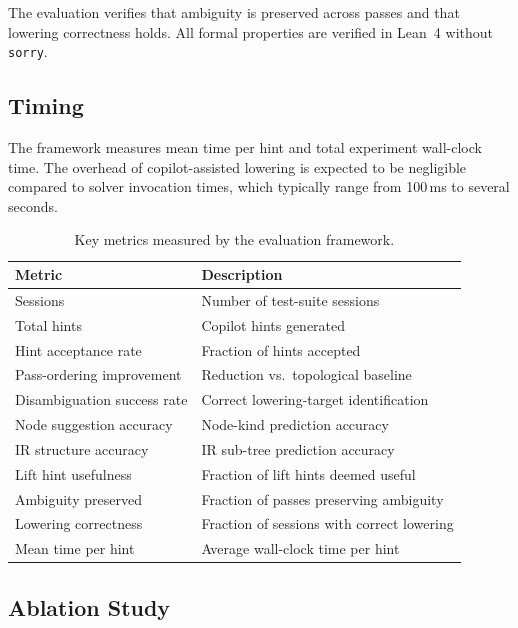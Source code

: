 \documentclass[11pt]{article}
\begin{document}
The evaluation verifies that ambiguity is preserved across passes and
that lowering correctness holds.  All formal
properties are verified in Lean~4 without \texttt{sorry}.

\subsection{Timing}\label{sec:exp-timing}

The framework measures mean time per hint and total
experiment wall-clock time.  The overhead of
copilot-assisted lowering is expected to be negligible compared to solver invocation
times, which typically range from 100\,ms to several seconds.

\begin{table}[t]
\centering
\caption{Key metrics measured by the evaluation framework.}
\label{tab:summary}
\begin{tabular}{l l}
\hline
\textbf{Metric} & \textbf{Description} \\
\hline
Sessions                        & Number of test-suite sessions \\
Total hints                     & Copilot hints generated \\
Hint acceptance rate            & Fraction of hints accepted \\
Pass-ordering improvement       & Reduction vs.\ topological baseline \\
Disambiguation success rate     & Correct lowering-target identification \\
Node suggestion accuracy        & Node-kind prediction accuracy \\
IR structure accuracy           & IR sub-tree prediction accuracy \\
Lift hint usefulness            & Fraction of lift hints deemed useful \\
Ambiguity preserved             & Fraction of passes preserving ambiguity \\
Lowering correctness            & Fraction of sessions with correct lowering \\
Mean time per hint              & Average wall-clock time per hint \\
\hline
\end{tabular}
\end{table}

\subsection{Ablation Study}\label{sec:exp-ablation}
\end{document}

